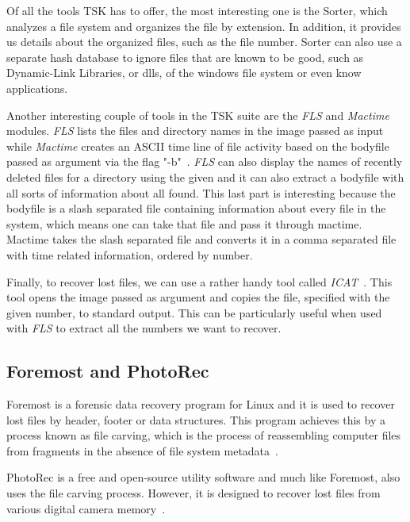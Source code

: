 Of all the tools \ac{TSK} has to offer, the most interesting one is the Sorter, which analyzes a file system and organizes the file by extension. In addition, it provides us details about the organized files, such as the file \INODE number. Sorter can also use a separate hash database to ignore files that are known to be good, such as Dynamic-Link Libraries, or dlls, of the windows file system or even know applications.

Another interesting couple of tools in the \ac{TSK} suite are the \textit{FLS} and \textit{Mactime} modules. \textit{FLS} lists the files and directory names in the image passed as input~\cite{BrianFls} while \textit{Mactime} creates an ASCII time line of file activity based on the bodyfile passed as argument via the flag "-b"~\cite{BrianMactime}. \textit{FLS} can also display the names of recently deleted files for a directory using the given \INODE and it can also extract a bodyfile with all sorts of information about all \INODES found. This last part is interesting because the bodyfile is a slash separated file containing information about every file in the system, which means one can take that file and pass it through mactime. Mactime takes the slash separated file and converts it in a comma separated file with time related information, ordered by \INODE number.

Finally, to recover lost files, we can use a rather handy tool called \textit{ICAT}~\cite{BrianIcat}. This tool opens the image passed as argument and copies the file, specified with the given \INODE number, to standard output. This can be particularly useful when used with \textit{FLS} to extract all the \INODE numbers we want to recover.

\subsection{Foremost and PhotoRec}

Foremost is a forensic data recovery program for Linux and it is used to recover lost files by header, footer or data structures. This program achieves this by a process known as file carving, which is the process of reassembling computer files from fragments in the absence of file system metadata~\cite{foremostUbuntu}. 

PhotoRec is a free and open-source utility software and much like Foremost, also uses the file carving process. However, it is designed to recover lost files from various digital camera memory~\cite{photoRec}.